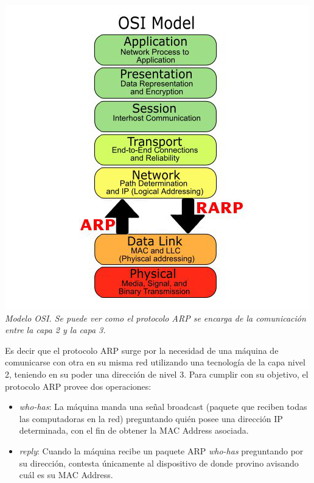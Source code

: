 \vspace{\baselineskip}
        \begin{center}
        \includegraphics[scale=0.40]{fig/osimodel.jpeg}        
        \vspace{1pt}
        \footnotesize\textit{Modelo OSI. Se puede ver como el protocolo ARP se encarga de la comunicación entre la capa 2 y la capa 3.}
      \end{center}
    \vspace{\baselineskip}
\par

Es decir que el protocolo ARP surge por la necesidad de una máquina de comunicarse con otra en su misma red utilizando una tecnología de la capa nivel 2, teniendo en su poder una dirección de nivel 3. Para cumplir con su objetivo, el protocolo ARP provee dos operaciones:

\begin{itemize}
    \item \textit{who-has}: La máquina manda una señal broadcast (paquete que reciben todas las computadoras en la red) preguntando quién posee una dirección IP determinada, con el fin de obtener la MAC Address asociada.
    \item \textit{reply}: Cuando la máquina recibe un paquete ARP \textit{who-has} preguntando por su dirección, contesta únicamente al dispositivo de donde provino avisando cuál es su MAC Address.
\end{itemize}

